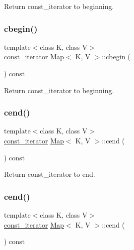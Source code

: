 Return const\+\_\+iterator to beginning. \mbox{\label{classMap_a489400386fcc9a5e8acd21fbf2c528a1}} 
\subsubsection{\texorpdfstring{cbegin()}{cbegin()}\hspace{0.1cm}{\footnotesize\ttfamily [2/2]}}
{\footnotesize\ttfamily template$<$class K, class V$>$ \\
\hyperlink{classMap_add90fe1e25806ba6f6278b264e78ee9a}{const\+\_\+iterator} \hyperlink{classMap}{Map}$<$ K, V $>$\+::cbegin (\begin{DoxyParamCaption}{ }\end{DoxyParamCaption}) const\hspace{0.3cm}{\ttfamily [inline]}}

Return const\+\_\+iterator to beginning. \mbox{\label{classMap_a40031f69b69e9bf0fe13319463f4251d}} 
\subsubsection{\texorpdfstring{cend()}{cend()}\hspace{0.1cm}{\footnotesize\ttfamily [1/2]}}
{\footnotesize\ttfamily template$<$class K, class V$>$ \\
\hyperlink{classMap_add90fe1e25806ba6f6278b264e78ee9a}{const\+\_\+iterator} \hyperlink{classMap}{Map}$<$ K, V $>$\+::cend (\begin{DoxyParamCaption}{ }\end{DoxyParamCaption}) const\hspace{0.3cm}{\ttfamily [inline]}}

Return const\+\_\+iterator to end. \mbox{\label{classMap_a40031f69b69e9bf0fe13319463f4251d}} 
\subsubsection{\texorpdfstring{cend()}{cend()}\hspace{0.1cm}{\footnotesize\ttfamily [2/2]}}
{\footnotesize\ttfamily template$<$class K, class V$>$ \\
\hyperlink{classMap_add90fe1e25806ba6f6278b264e78ee9a}{const\+\_\+iterator} \hyperlink{classMap}{Map}$<$ K, V $>$\+::cend (\begin{DoxyParamCaption}{ }\end{DoxyParamCaption}) const\hspace{0.3cm}{\ttfamily [inline]}}

